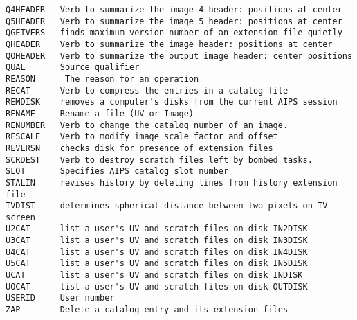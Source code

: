 \begin{verbatim}
Q4HEADER   Verb to summarize the image 4 header: positions at center
Q5HEADER   Verb to summarize the image 5 header: positions at center
QGETVERS   finds maximum version number of an extension file quietly
QHEADER    Verb to summarize the image header: positions at center
QOHEADER   Verb to summarize the output image header: center positions
QUAL       Source qualifier
REASON      The reason for an operation
RECAT      Verb to compress the entries in a catalog file
REMDISK    removes a computer's disks from the current AIPS session
RENAME     Rename a file (UV or Image)
RENUMBER   Verb to change the catalog number of an image.
RESCALE    Verb to modify image scale factor and offset
REVERSN    checks disk for presence of extension files
SCRDEST    Verb to destroy scratch files left by bombed tasks.
SLOT       Specifies AIPS catalog slot number
STALIN     revises history by deleting lines from history extension file
TVDIST     determines spherical distance between two pixels on TV screen
U2CAT      list a user's UV and scratch files on disk IN2DISK
U3CAT      list a user's UV and scratch files on disk IN3DISK
U4CAT      list a user's UV and scratch files on disk IN4DISK
U5CAT      list a user's UV and scratch files on disk IN5DISK
UCAT       list a user's UV and scratch files on disk INDISK
UOCAT      list a user's UV and scratch files on disk OUTDISK
USERID     User number
ZAP        Delete a catalog entry and its extension files
\end{verbatim}\eve

\vfill\eject
{}

